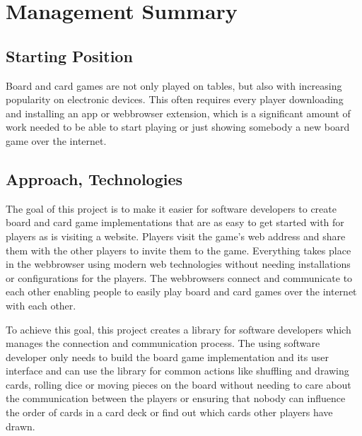 % 

\chapter*{Management Summary}

\section*{Starting Position}

Board and card games are not only played on tables, but also with increasing
popularity on electronic devices. This often requires every player downloading
and installing an app or webbrowser extension, which is a significant amount of
work needed to be able to start playing or just showing somebody a new board
game over the internet.

\section*{Approach, Technologies}

The goal of this project is to make it easier for software developers to create
board and card game implementations that are as easy to get started with for
players as is visiting a website. Players visit the game's web address and share them
with the other players to invite them to the game. Everything takes place in the
webbrowser using modern web technologies without needing installations or
configurations for the players. The webbrowsers connect and communicate to each
other enabling people to easily play board and card games over the internet with
each other.

To achieve this goal, this project creates a library for software developers
which manages the connection and communication process. The using software
developer only needs to build the board game implementation and its user
interface and can use the library for common actions like shuffling and drawing
cards, rolling dice or moving pieces on the board without needing to care about
the communication between the players or ensuring that nobody can influence the
order of cards in a card deck or find out which cards other players have drawn.

